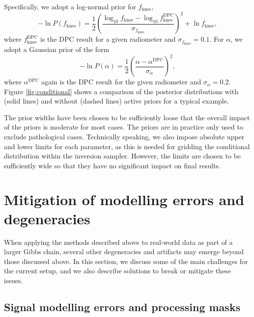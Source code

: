 \documentclass[twocolumn]{aa}
\begin{document}
Specifically, we adopt a log-normal prior for $f_\mathrm{knee}$,
\begin{equation}\label{eq:fknee_prior}
	-\ln P(f_\mathrm{knee}) =  \frac{1}{2}\left(\frac{\log_{10} f_\mathrm{knee}  - \log_{10} f^\mathrm{DPC}_\mathrm{knee} }{\sigma_{f_\mathrm{knee}}}\right)^2 + \ln f_\mathrm{knee},
\end{equation}
where $f^\mathrm{DPC}_\mathrm{knee}$ is the DPC result for a given
radiometer \citep{planck2016-l02} and $\sigma_{f_\mathrm{knee}} = 0.1$. For $\alpha$, we
adopt a Gaussian prior of the form
\begin{equation}\label{eq:alpha_prior}
	-\ln P(\alpha) =  \frac{1}{2}\left(\frac{\alpha  - \alpha^\mathrm{DPC}}{\sigma_\alpha}\right)^2,
\end{equation}
where $\alpha^\mathrm{DPC}$ again is the DPC result for the given
radiometer and $\sigma_\alpha = 0.2$. 
Figure \ref{fig:conditional} shows a comparison of the posterior
distributions with (solid lines) and without (dashed lines) active
priors for a typical example.

The prior widths have been chosen to be
sufficiently loose that the overall impact of the priors is moderate
for most cases. The priors are in practice only used to exclude
pathological cases. Technically speaking, we also
impose absolute upper and lower limits for each parameter, as this is
needed for gridding the conditional distribution within the inversion
sampler. However, the limits are chosen to be sufficiently wide so that they have no
significant impact on final results.



\section{Mitigation of modelling errors and degeneracies}
\label{sec:degeneracies}

When applying the methods described above to real-world data as part
of a larger Gibbs chain, several other degeneracies and artifacts may
emerge beyond those discussed above. In this section, we discuss some
of the main challenges for the current setup, and we also describe
solutions to break or mitigate these issues.

\subsection{Signal modelling errors and processing masks}
\end{document}
